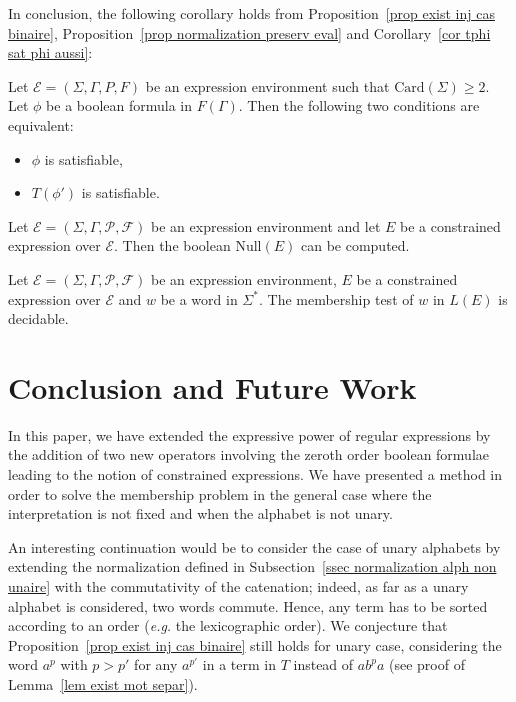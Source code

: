 \documentclass[a4paper]{llncs}
\begin{document}
  In conclusion, the following corollary holds from Proposition~\ref{prop exist inj cas binaire}, Proposition~\ref{prop normalization preserv eval} and Corollary~\ref{cor tphi sat phi aussi}:
  
  \begin{corollary}
    Let $\mathcal{E}=(\Sigma,\Gamma,P,F)$ be an expression environment such that $\mathrm{Card}(\Sigma)\geq 2$. Let $\phi$ be a boolean formula in $F(\Gamma)$. Then the  following two conditions are equivalent:
    \begin{itemize}
      \item $\phi$ is satisfiable,
\item $T(\phi')$ is satisfiable.
    \end{itemize}
  \end{corollary}
  
  \begin{corollary}
    Let $\mathcal{E}=(\Sigma,\Gamma,\mathcal{P},\mathcal{F})$ be an expression environment and let $E$ be a constrained expression over $\mathcal{E}$. Then the boolean $\mathrm{Null}(E)$ can be computed.
  \end{corollary}
  
  \begin{corollary}
    Let $\mathcal{E}=(\Sigma,\Gamma,\mathcal{P},\mathcal{F})$ be an expression environment, $E$ be a constrained expression over $\mathcal{E}$ and $w$ be a word in $\Sigma^*$. The membership test of $w$ in $L(E)$ is decidable.
  \end{corollary}
  


\section{Conclusion and Future Work}

  In this paper, we have extended the expressive power of regular expressions by the addition of two new operators involving the zeroth order boolean formulae leading to the notion of constrained expressions. We have presented a method in order to solve the membership problem in the general case where the interpretation is not fixed and when the alphabet is not unary.
  
  An interesting continuation would be to consider the case of unary alphabets by extending the normalization defined in Subsection~\ref{ssec normalization alph non unaire} with the commutativity of the catenation; indeed, as far as a unary alphabet is considered, two words commute. Hence, any term has to be sorted according to an order (\emph{e.g.} the lexicographic order). We conjecture that Proposition~\ref{prop exist inj cas binaire} still holds for unary case, considering the word $a^p$ with $p>p'$ for any $a^{p'}$ in a term in $T$ instead of $ab^pa$ (see proof of Lemma~\ref{lem exist mot separ}).
  
\end{document}
